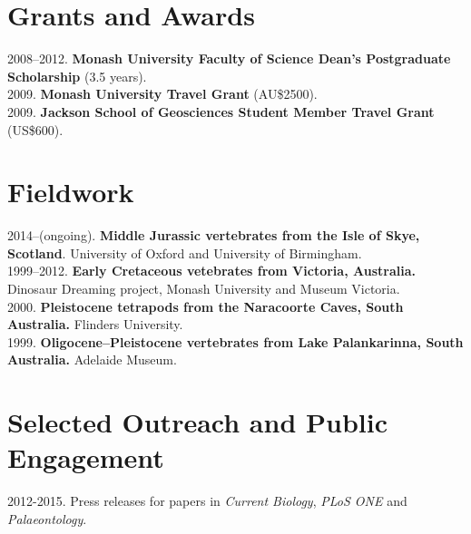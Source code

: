 \documentclass[a4paper, oneside, final]{scrartcl} %
\begin{document}
\begin{center}
\begin{flushleft}
\section{Grants and Awards}
\begin{flushleft}
2008--2012. \textbf{Monash University Faculty of Science Dean's Postgraduate Scholarship} (3.5 years). \\
2009. \textbf{Monash University Travel Grant} (AU\$2500). \\
2009. \textbf{Jackson School of Geosciences Student Member Travel Grant} (US\$600).
\end{flushleft}



\section{Fieldwork}

\begin{flushleft}
2014--(ongoing). \textbf{Middle Jurassic vertebrates from the Isle of Skye, Scotland}. University of Oxford and University of Birmingham.\\
1999--2012. \textbf{Early Cretaceous vetebrates from Victoria, Australia.} Dinosaur Dreaming project, Monash University and Museum Victoria.\\
2000. \textbf{Pleistocene tetrapods from the Naracoorte Caves, South Australia.} Flinders University.\\
1999. \textbf{Oligocene--Pleistocene vertebrates from Lake Palankarinna, South Australia.} Adelaide Museum.\\
\end{flushleft}




\section{Selected Outreach and Public Engagement}
\begin{flushleft}
2012-2015. Press releases for papers in \emph{Current Biology}, \emph{PLoS ONE} and \emph{Palaeontology}.\\


\end{flushleft}
\end{flushleft}
\end{center}
\end{document}
